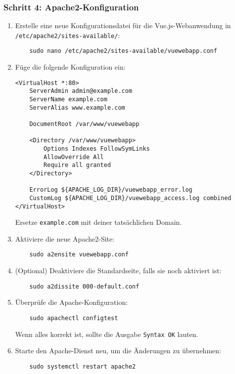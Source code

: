 \documentclass[a4paper,12pt]{article}
\begin{document}
\subsubsection{Schritt 4: Apache2-Konfiguration}
\begin{enumerate}
    \item Erstelle eine neue Konfigurationsdatei für die Vue.js-Webanwendung in \texttt{/etc/apache2/sites-available/}:

    \begin{lstlisting}
    sudo nano /etc/apache2/sites-available/vuewebapp.conf
    \end{lstlisting}
    
    \item Füge die folgende Konfiguration ein:
    
    \begin{lstlisting}
<VirtualHost *:80>
    ServerAdmin admin@example.com
    ServerName example.com
    ServerAlias www.example.com

    DocumentRoot /var/www/vuewebapp

    <Directory /var/www/vuewebapp>
        Options Indexes FollowSymLinks
        AllowOverride All
        Require all granted
    </Directory>

    ErrorLog ${APACHE_LOG_DIR}/vuewebapp_error.log
    CustomLog ${APACHE_LOG_DIR}/vuewebapp_access.log combined
</VirtualHost>
    \end{lstlisting}
    
    Ersetze \texttt{example.com} mit deiner tatsächlichen Domain.

    \item Aktiviere die neue Apache2-Site:
    
    \begin{lstlisting}
    sudo a2ensite vuewebapp.conf
    \end{lstlisting}
    
    \item (Optional) Deaktiviere die Standardseite, falls sie noch aktiviert ist:
    
    \begin{lstlisting}
    sudo a2dissite 000-default.conf
    \end{lstlisting}
    
    \item Überprüfe die Apache-Konfiguration:
    
    \begin{lstlisting}
    sudo apachectl configtest
    \end{lstlisting}
    
    Wenn alles korrekt ist, sollte die Ausgabe \texttt{Syntax OK} lauten.

    \item Starte den Apache-Dienst neu, um die Änderungen zu übernehmen:
    
    \begin{lstlisting}
    sudo systemctl restart apache2
    \end{lstlisting}
\end{enumerate}
\end{document}

